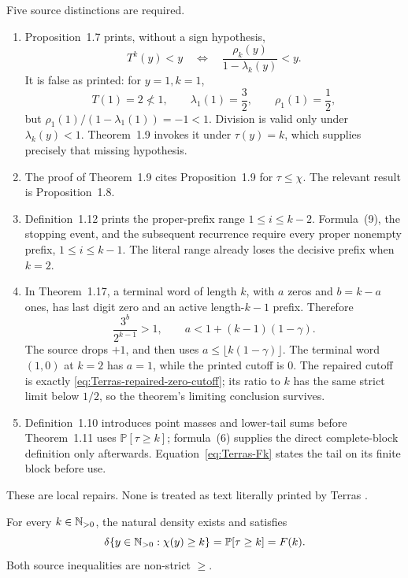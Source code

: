 \begin{sourceissue}
\label{sourceissue:Terras-1976-defects}
Five source distinctions are required.

\begin{enumerate}
\item Proposition~1.7 prints, without a sign hypothesis,
\[
 T^k(y)<y
 \quad\Longleftrightarrow\quad
 \frac{\rho_k(y)}{1-\lambda_k(y)}<y.
\]
It is false as printed: for \(y=1,k=1\),
\[
 T(1)=2\not<1,\qquad
 \lambda_1(1)=\frac32,\qquad
 \rho_1(1)=\frac12,
\]
but \(\rho_1(1)/(1-\lambda_1(1))=-1<1\).  Division is valid only under
\(\lambda_k(y)<1\).  Theorem~1.9 invokes it under \(\tau(y)=k\), which
supplies precisely that missing hypothesis.

\item The proof of Theorem~1.9 cites Proposition~1.9 for
\(\tau\le\chi\).  The relevant result is Proposition~1.8.

\item Definition~1.12 prints the proper-prefix range \(1\le i\le k-2\).
Formula~(9), the stopping event, and the subsequent recurrence require every
proper nonempty prefix, \(1\le i\le k-1\).  The literal range already loses
the decisive prefix when \(k=2\).

\item In Theorem~1.17, a terminal word of length \(k\), with \(a\) zeros and
\(b=k-a\) ones, has last digit zero and an active length-\(k-1\) prefix.
Therefore
\[
 \frac{3^b}{2^{k-1}}>1,\qquad
 a<1+(k-1)(1-\gamma).
\]
The source drops \(+1\), and then uses
\(a\le\lfloor k(1-\gamma)\rfloor\).  The terminal word \((1,0)\) at
\(k=2\) has \(a=1\), while the printed cutoff is \(0\).  The repaired
cutoff is exactly \eqref{eq:Terras-repaired-zero-cutoff}; its ratio to \(k\)
has the same strict limit below \(1/2\), so the theorem's limiting conclusion
survives.

\item Definition~1.10 introduces point masses and lower-tail sums before
Theorem~1.11 uses \(\mathbb P[\tau\ge k]\); formula~(6) supplies the direct
complete-block definition only afterwards.  Equation~\eqref{eq:Terras-Fk}
states the tail on its finite block before use.
\end{enumerate}
These are local repairs.  None is treated as text literally printed by
Terras \cite[pp.~243--247]{Terras1976}.
\end{sourceissue}

\begin{theorem}
\label{thm:Terras-1979-density-identity}
For every \(k\in\mathbb{N}_{>0}\), the natural density exists and satisfies
\begin{equation}
\label{eq:Terras-1979-density}
 \delta\{y\in\mathbb{N}_{>0}:\chi(y)\ge k\}
 =\mathbb P[\tau\ge k]=F(k).
\end{equation}
Both source inequalities are non-strict \(\ge\).
\end{theorem}

